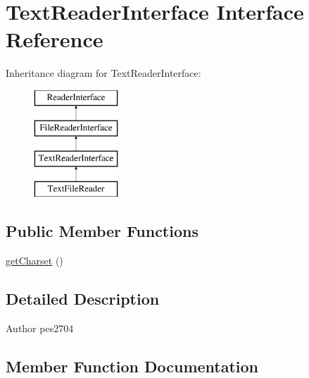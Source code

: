 \hypertarget{interface_pes_1_1_readers_1_1_text_reader_interface}{}\section{Text\+Reader\+Interface Interface Reference}
\label{interface_pes_1_1_readers_1_1_text_reader_interface}
Inheritance diagram for Text\+Reader\+Interface\+:\begin{figure}[H]
\begin{center}
\leavevmode
\includegraphics[height=4.000000cm]{interface_pes_1_1_readers_1_1_text_reader_interface}
\end{center}
\end{figure}
\subsection*{Public Member Functions}
\begin{DoxyCompactItemize}
\item 
\mbox{\hyperlink{interface_pes_1_1_readers_1_1_text_reader_interface_abca2d528da8311b6fcfe040768cbaa24}{get\+Charset}} ()
\end{DoxyCompactItemize}


\subsection{Detailed Description}
\begin{DoxyAuthor}{Author}
pes2704 
\end{DoxyAuthor}


\subsection{Member Function Documentation}
\mbox{\label{interface_pes_1_1_readers_1_1_text_reader_interface_abca2d528da8311b6fcfe040768cbaa24}} 
